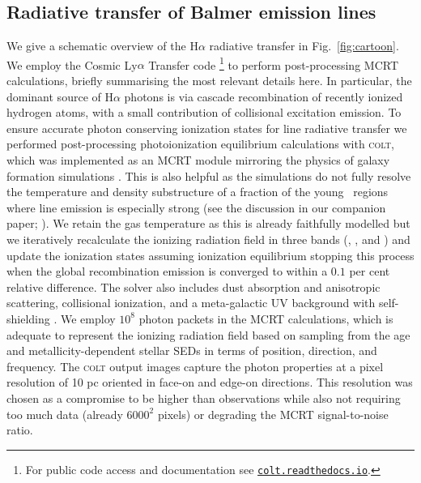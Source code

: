 \documentclass[fleqn,usenatbib]{mnras}
\newcommand\HII{\ion{H}{II}~} %
\begin{document}
\subsection{Radiative transfer of Balmer emission lines}
\label{subsec:rt}

We give a schematic overview of the H$\alpha$ radiative transfer in Fig.~\ref{fig:cartoon}. We employ the Cosmic Ly$\alpha$ Transfer code \citep[\textsc{colt}][]{smith15,smith19}\footnote{For public code access and documentation see \href{https://colt.readthedocs.io}{\texttt{colt.readthedocs.io}}.} to perform post-processing MCRT calculations, briefly summarising the most relevant details here. In particular, the dominant source of H$\alpha$ photons is via cascade recombination of recently ionized hydrogen atoms, with a small contribution of collisional excitation emission. To ensure accurate photon conserving ionization states for line radiative transfer we performed post-processing photoionization equilibrium calculations with \textsc{colt}, which was implemented as an MCRT module mirroring the physics of galaxy formation simulations \citep{rosdahl13_rt,kannan19_rt}. This is also helpful as the simulations do not fully resolve the temperature and density substructure of a fraction of the young \HII regions where line emission is especially strong (see the discussion in our companion paper; \citealt{smith21_rt}). We retain the gas temperature as this is already faithfully modelled but we iteratively recalculate the ionizing radiation field in three bands (, , and ) and update the ionization states assuming ionization equilibrium stopping this process when the global recombination emission is converged to within a $0.1$ per cent relative difference. The solver also includes dust absorption and anisotropic scattering, collisional ionization, and a meta-galactic UV background with self-shielding \citep{faucher-giguere09,rahmati13}. We employ $10^8$ photon packets in the MCRT calculations, which is adequate to represent the ionizing radiation field based on sampling from the age and metallicity-dependent stellar SEDs in terms of position, direction, and frequency. The \textsc{colt} output images capture the photon properties at a pixel resolution of 10 pc oriented in face-on and edge-on directions. This resolution was chosen as a compromise to be higher than observations while also not requiring too much data (already $6000^2$ pixels) or degrading the MCRT signal-to-noise ratio.
\end{document}
